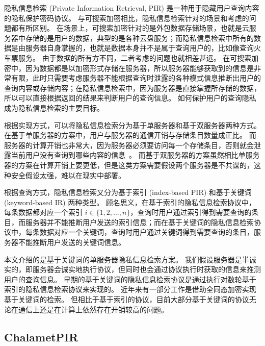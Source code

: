 隐私信息检索 (Private Information Retrieval, PIR) 是一种用于隐藏用户查询内容的隐私保护密码协议。
与可搜索加密相比，隐私信息检索针对的场景和考虑的问题都有所区别。
在场景上，可搜索加密针对的是外包数据存储场景，也就是云服务器中存储的是用户的数据，典型的是各种云盘服务；而隐私信息检索中所有的数据是由服务器自身掌握的，也就是数据本身并不是属于查询用户的，比如像查询火车票服务。
由于数据的所有方不同，二者考虑的问题也就相差甚远。
在可搜索加密中，因为数据都是以加密形式存储在服务器，所以服务器能够获取到的信息是非常有限，此时只需要考虑服务器不能根据查询时泄露的各种模式信息推断出用户的查询内容或存储内容；在隐私信息检索中，因为服务器是直接掌握所存储的数据，所以可以直接根据返回的结果来判断用户的查询信息。
如何保护用户的查询隐私成为隐私信息检索的主要目标。

根据实现方式，可以将隐私信息检索分为基于单服务器和基于双服务器两种方式。
在基于单服务器的方案中，用户与服务器的通信开销与存储条目数量成正比。
而服务器的计算开销也非常大，因为服务器必须要访问每一个存储条目，否则就会泄露当前用户没有查询到哪些内容的信息~\cite{beimel2004reducing}。
而基于双服务器的方案虽然相比单服务器的方案在计算开销上要更低，但是这类方案需要假设两个服务器是不共谋的，这种安全假设太强，难以在现实中部署。

根据查询方式，隐私信息检索又分为基于索引 (index-based PIR) 和基于关键词 (keyword-based IR) 两种类型。
顾名思义，在基于索引的隐私信息检索协议中，每条数据都对应一个索引 $i\in \{1, 2, \dots, n\}$，查询时用户通过索引得到需要查询的条目，而服务器并不能推断用户发送的索引信息；而在基于关键词的隐私信息检索协议中，每条数据对应一个关键词，查询时用户通过关键词得到需要查询的条目，服务器不能推断用户发送的关键词信息。

本文介绍的是基于关键词的单服务器隐私信息检索方案。
我们假设服务器是半诚实的，即服务器会诚实地执行协议，但同时也会通过协议执行时获取的信息来推测用户的查询信息。
早期的基于关键词的隐私信息检索协议是通过执行对数轮基于索引的隐私信息检索协议来实现的。
近年来有一部分工作是借助全同态加密实现基于关键词的检索。
但相比于基于索引的协议，目前大部分基于关键词的协议无论在通信上还是在计算上依然存在开销较高的问题。

\subsection{ChalametPIR}

